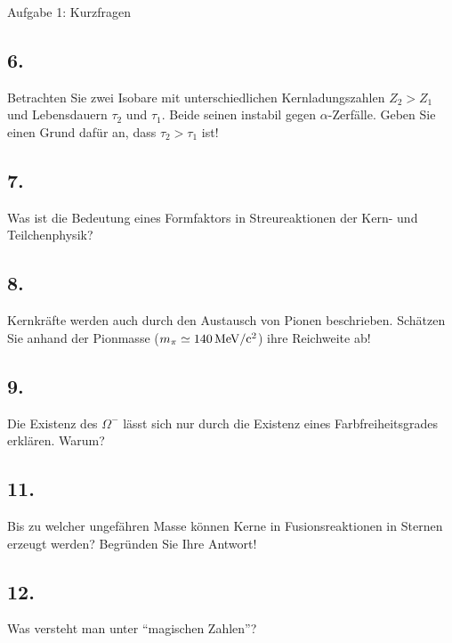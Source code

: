 \begin{aufgabe}{Aufgabe 1: Kurzfragen}
    \subsection{6.}
    Betrachten Sie zwei Isobare mit unterschiedlichen Kernladungszahlen $Z_2 > Z_1$ und Lebensdauern $\tau_2$ und $\tau_1$.
    Beide seinen instabil gegen $\alpha$-Zerfälle.
    Geben Sie einen Grund dafür an, dass $\tau_2 > \tau_1$ ist!

    \subsection{7.}
    Was ist die Bedeutung eines Formfaktors in Streureaktionen der Kern- und Teilchenphysik?

    \subsection{8.}
    Kernkräfte werden auch durch den Austausch von Pionen beschrieben.
    Schätzen Sie anhand der Pionmasse ($m_\pi \simeq \SI{140}{\mega\electronvolt\per{c}\squared}$) ihre Reichweite ab!

    \subsection{9.}
    Die Existenz des $\Omega^-$ lässt sich nur durch die Existenz eines Farbfreiheitsgrades erklären.
    Warum?


    \subsection{11.}
    Bis zu welcher ungefähren Masse können Kerne in Fusionsreaktionen in Sternen erzeugt werden?
    Begründen Sie Ihre Antwort!

    \subsection{12.}
    Was versteht man unter \enquote{magischen Zahlen}?
\end{aufgabe}

